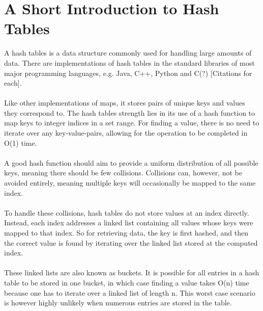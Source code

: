 \section{A Short Introduction to Hash Tables}
A hash tables is a data structure commonly used for handling large amounts of data.
There are implementations of hash tables in the standard libraries of most major programming languages, e.g. Java, C++, Python and C(?) [Citations for each].\\\\
Like other implementations of maps, it stores pairs of unique keys and values they correspond to. The hash tables strength lies in its use of a hash function to map keys to integer indices in a set range. For finding a value, there is no need to iterate over any key-value-pairs, allowing for the operation to be completed in O(1) time.\\\\
A good hash function should aim to provide a uniform distribution of all possible keys, meaning there should be few collisions. Collisions can, however, not be avoided entirely, meaning multiple keys will occasionally be mapped to the same index.\\\\
To handle these collisions, hash tables do not store values at an index directly. Instead, each index addresses a linked list containing all values whose keys were mapped to that index.
So for retrieving data, the key is first hashed, and then the correct value is found by iterating over the linked list stored at the computed index.\\\\
These linked lists are also known as buckets. It is possible for all entries in a hash table to be stored in one bucket, in which case finding a value takes O(n) time because one has to iterate over a linked list of length n. This worst case scenario is however highly unlikely when numerous entries are stored in the table.
